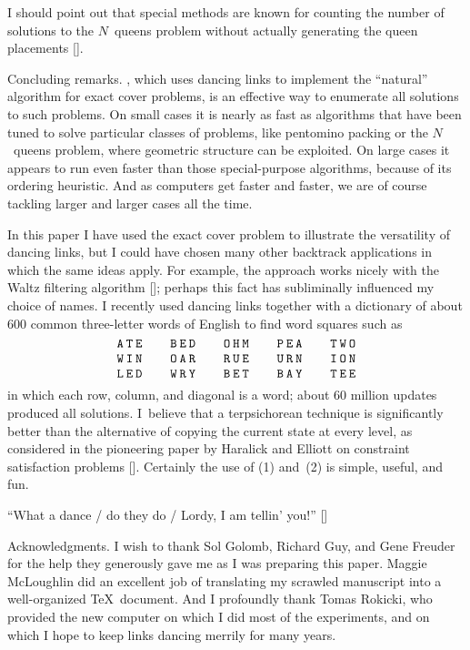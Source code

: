 I should point out that special methods are known for counting the number of
solutions to the $N$~queens problem without actually generating the
queen placements [\RVZ].

\newsection Concluding remarks.
\AlgoDLX, which uses dancing links to implement the ``natural''
algorithm for exact cover problems, is an effective way to enumerate
all solutions to such problems.  On small cases it is nearly as fast
as algorithms that have been tuned to solve particular classes of
problems, like pentomino packing or the $N$~queens problem, where
geometric structure can be exploited.  On large cases it appears to
run even faster than those special-purpose algorithms, because of its
ordering heuristic.  And as computers get faster and faster, we are of
course tackling larger and larger cases all the time.

In this paper I have used the exact cover problem to illustrate the
versatility of dancing links, but I could have chosen many other
backtrack applications in which the same ideas apply.  For example,
the approach works nicely with the Waltz filtering algorithm [\W];
perhaps this fact has subliminally influenced my choice of names.  I
recently used dancing links together with a dictionary of about 600
common three-letter words of English to find word squares such as
$$\def\\#1#2#3#4#5#6#7#8#9{\vcenter{\halign{&\tt\kern.1em##\kern.1em\cr
 #1&#2&#3\cr#4&#5&#6\cr#7&#8&#9\cr}}}
\\ATEWINLED \qquad
\\BEDOARWRY \qquad
\\OHMRUEBET \qquad
\\PEAURNBAY \qquad
\\TWOIONTEE$$
in which each row, column, and diagonal is a word; about 60 million
updates produced all solutions.
I~believe that a terpsichorean technique is significantly better than
the alternative of copying the current state at every level, as
considered in the pioneering paper by Haralick and Elliott on
constraint satisfaction problems [\HE].  Certainly the use of (1) and~(2)
is simple, useful, and fun.

\medskip
``What a dance / do they do / Lordy, I am tellin' you!'' [\MM]

\newsection Acknowledgments.
I wish to thank Sol Golomb, Richard Guy, and Gene Freuder for the help
they generously gave me as I was preparing this paper.
Maggie McLoughlin did an excellent job of translating my scrawled
manuscript into a well-organized \TeX\ document. And I
profoundly thank Tomas Rokicki, who provided the new computer on which
I did most of the experiments, and on which I hope to keep links
dancing merrily for many years.

